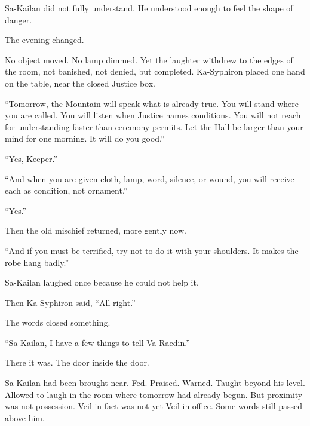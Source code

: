 Sa-Kailan did not fully understand.
He understood enough to feel the shape of danger.\par




The evening changed.\par

No object moved.
No lamp dimmed.
Yet the laughter withdrew to the edges of the room, not banished, not denied, but completed.
Ka-Syphiron placed one hand on the table, near the closed Justice box.\par

“Tomorrow, the Mountain will speak what is already true.
You will stand where you are called.
You will listen when Justice names conditions.
You will not reach for understanding faster than ceremony permits.
Let the Hall be larger than your mind for one morning.
It will do you good.”\par

“Yes, Keeper.”\par

“And when you are given cloth, lamp, word, silence, or wound, you will receive each as condition, not ornament.”\par

“Yes.”\par

Then the old mischief returned, more gently now.\par

“And if you must be terrified, try not to do it with your shoulders.
It makes the robe hang badly.”\par

Sa-Kailan laughed once because he could not help it.\par




Then Ka-Syphiron said, “All right.”\par

The words closed something.\par

“Sa-Kailan, I have a few things to tell Va-Raedin.”\par

There it was.
The door inside the door.\par

Sa-Kailan had been brought near.
Fed.
Praised.
Warned.
Taught beyond his level.
Allowed to laugh in the room where tomorrow had already begun.
But proximity was not possession.
Veil in fact was not yet Veil in office.
Some words still passed above him.\par

